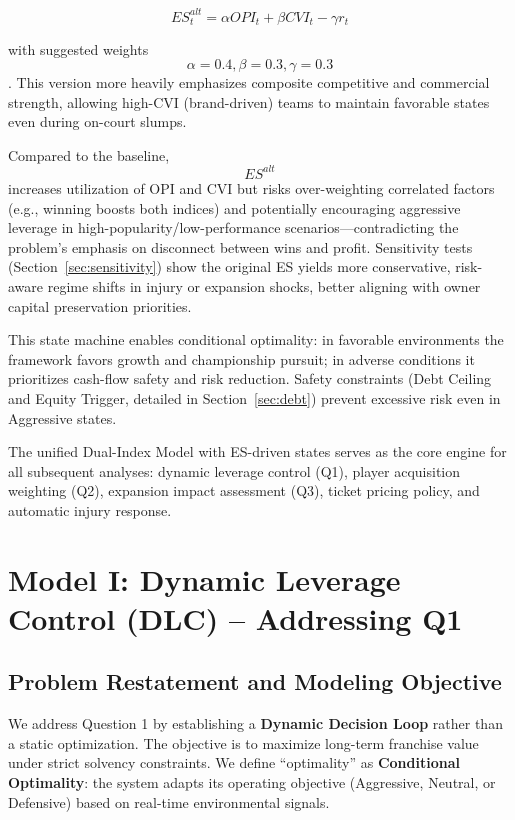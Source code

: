 \documentclass{mcmthesis}
\begin{document}
$$   
ES_t^{alt} = \alpha OPI_t + \beta CVI_t - \gamma r_t
   $$

with suggested weights $$   \alpha=0.4   ,    \beta=0.3   ,    \gamma=0.3   $$. This version more heavily emphasizes composite competitive and commercial strength, allowing high-CVI (brand-driven) teams to maintain favorable states even during on-court slumps.

Compared to the baseline, $$   ES^{alt}   $$ increases utilization of OPI and CVI but risks over-weighting correlated factors (e.g., winning boosts both indices) and potentially encouraging aggressive leverage in high-popularity/low-performance scenarios—contradicting the problem's emphasis on disconnect between wins and profit. Sensitivity tests (Section~\ref{sec:sensitivity}) show the original ES yields more conservative, risk-aware regime shifts in injury or expansion shocks, better aligning with owner capital preservation priorities.

This state machine enables conditional optimality: in favorable environments the framework favors growth and championship pursuit; in adverse conditions it prioritizes cash-flow safety and risk reduction. Safety constraints (Debt Ceiling and Equity Trigger, detailed in Section~\ref{sec:debt}) prevent excessive risk even in Aggressive states.

The unified Dual-Index Model with ES-driven states serves as the core engine for all subsequent analyses: dynamic leverage control (Q1), player acquisition weighting (Q2), expansion impact assessment (Q3), ticket pricing policy, and automatic injury response.


\section{Model I: Dynamic Leverage Control (DLC) -- Addressing Q1}
\label{sec:leverage}

\subsection{Problem Restatement and Modeling Objective}
We address Question 1 by establishing a \textbf{Dynamic Decision Loop} rather than a static optimization. The objective is to maximize long-term franchise value under strict solvency constraints. We define ``optimality'' as \textbf{Conditional Optimality}: the system adapts its operating objective (Aggressive, Neutral, or Defensive) based on real-time environmental signals.
\end{document}
